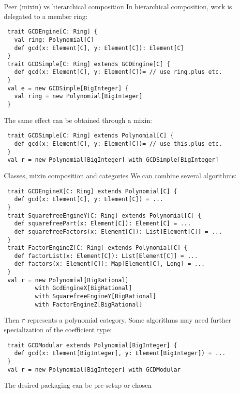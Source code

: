 \documentclass[final]{beamer}
\newcommand{\code}[1]{\texttt{#1}}
\begin{document}
\begin{frame}[fragile]
\begin{columns}[t]
\begin{column}{.3\linewidth}
  \begin{block}{\large Peer (mixin) vs hierarchical composition}
\tiny %
{\footnotesize In hierarchical composition, work is delegated to
a member ring:}\par
\begin{lstlisting}
 trait GCDEngine[C: Ring] {
   val ring: Polynomial[C]
   def gcd(x: Element[C], y: Element[C]): Element[C]
 }
 trait GCDSimple[C: Ring] extends GCDEngine[C] {
   def gcd(x: Element[C], y: Element[C])= // use ring.plus etc.
 }
 val e = new GCDSimple[BigInteger] {
   val ring = new Polynomial[BigInteger]
 }
\end{lstlisting}
{\footnotesize The same effect can be obtained through a mixin:}\par
\begin{lstlisting}
 trait GCDSimple[C: Ring] extends Polynomial[C] {
   def gcd(x: Element[C], y: Element[C])= // use this.plus etc.
 }
 val r = new Polynomial[BigInteger] with GCDSimple[BigInteger]
\end{lstlisting}
  \end{block}
  \hfill
  \begin{block}{\large Classes, mixin composition and categories}
\tiny %
{\footnotesize We can combine several algorithms:}\par
\begin{lstlisting}
 trait GCDEngineX[C: Ring] extends Polynomial[C] {
   def gcd(x: Element[C], y: Element[C]) = ...
 }
 trait SquarefreeEngineY[C: Ring] extends Polynomial[C] {
   def squarefreePart(x: Element[C]): Element[C] = ...
   def squarefreeFactors(x: Element[C]): List[Element[C]] = ...
 }
 trait FactorEngineZ[C: Ring] extends Polynomial[C] {
   def factorList(x: Element[C]): List[Element[C]] = ...
   def factors(x: Element[C]): Map[Element[C], Long] = ...
 }
 val r = new Polynomial[BigRational]
         with GcdEngineX[BigRational] 
         with SquarefreeEngineY[BigRational]
         with FactorEngineZ[BigRational]
\end{lstlisting}
{\footnotesize Then \code{r} represents a polynomial category.
}
{\footnotesize Some algorithms may need further specialization
of the coefficient type:}\par
\begin{lstlisting}
 trait GCDModular extends Polynomial[BigInteger] {
   def gcd(x: Element[BigInteger], y: Element[BigInteger]) = ...
 }
 val r = new Polynomial[BigInteger] with GCDModular
\end{lstlisting}
{\footnotesize The desired packaging can be pre-setup or chosen
}
\end{block}
\end{column}
\end{columns}
\end{frame}
\end{document}
